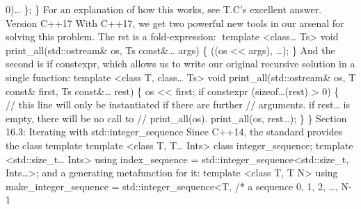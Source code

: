 0)\ldots{} \}; \} For an explanation of how this works, see T.C's
excellent answer. Version C++17 With C++17, we get two powerful new
tools in our arsenal for solving this problem. The rst is a
fold-expression: template \textless class\ldots{} Ts\textgreater{} void
print\_all(std::ostream\& os, Ts const\&\ldots{} args) \{ ((os
\textless\textless{} args), \ldots); \} And the second is if constexpr,
which allows us to write our original recursive solution in a single
function: template \textless class T, class\ldots{} Ts\textgreater{}
void print\_all(std::ostream\& os, T const\& first, Ts const\&\ldots{}
rest) \{ os \textless\textless{} first; if constexpr (sizeof\ldots(rest)
\textgreater{} 0) \{\\
// this line will only be instantiated if there are further //
arguments. if rest\ldots{} is empty, there will be no call to //
print\_all(os). print\_all(os, rest\ldots); \} \} Section 16.3:
Iterating with std::integer\_sequence Since C++14, the standard provides
the class template template \textless class T, T\ldots{}
Ints\textgreater{} class integer\_sequence; template
\textless std::size\_t\ldots{} Ints\textgreater{} using index\_sequence
= std::integer\_sequence\textless std::size\_t, Ints\ldots\textgreater;
and a generating metafunction for it: template \textless class T, T
N\textgreater{} using make\_integer\_sequence =
std::integer\_sequence\textless T, /* a sequence 0, 1, 2, \ldots, N-1
